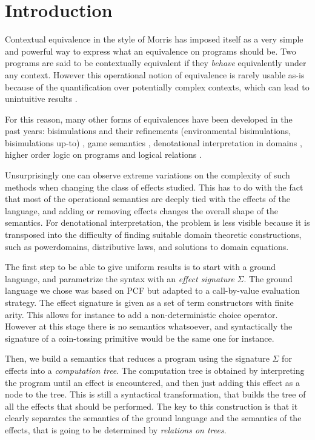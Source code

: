 \section{Introduction}

Contextual equivalence in the style of Morris
has imposed itself as a very simple and powerful
way to express what an equivalence on programs should be. 
Two programs are said to be contextually equivalent if 
they \emph{behave} equivalently under any context. 
However this operational notion of equivalence is rarely usable 
as-is because of the quantification over potentially complex 
contexts, which can lead to unintuitive results \cite{pitts1997operationally}.

For this reason, many other forms of equivalences have 
been developed in the past years: bisimulations 
and their refinements (environmental bisimulations, 
bisimulations up-to) \cite{koutavas2011applicative}, 
game semantics \cite{abramsky1999game}, 
denotational interpretation in domains \cite{scott1982domains}, 
higher order logic on 
programs \cite{honda2005observationally} 
and logical relations \cite{Pitts2000}.

Unsurprisingly one can observe extreme variations on 
the complexity of such methods when changing  
the class of effects studied. This has to do with 
the fact that most of the operational semantics 
are deeply tied with the effects of the language, 
and adding or removing effects changes the overall 
shape of the semantics. For denotational interpretation,
the problem is less visible because it is transposed 
into the difficulty of finding suitable domain theoretic constructions, 
such as powerdomains, distributive laws,
and solutions to domain equations.


The first step to be able to give uniform results 
is to start with a ground language, and parametrize 
the syntax with an \emph{effect signature} $\Sigma$. The ground
language we chose was based on PCF \cite{plotkin1977lcf} 
but adapted to a call-by-value evaluation strategy.
The effect signature is given as a set of term constructors 
with finite arity. This allows for instance to add 
a non-deterministic choice operator. However at this 
stage there is no semantics whatsoever, and syntactically 
the signature of a coin-tossing primitive would be the same one 
for instance.

Then, we build a semantics that reduces a program 
using the signature $\Sigma$ for effects into 
a \emph{computation tree}. The computation tree 
is obtained by interpreting the program until 
an effect is encountered, and then just adding 
this effect as a node to the tree. This is still 
a syntactical transformation, that builds the 
tree of all the effects that should be performed. 
The key to this construction is that it clearly 
separates the semantics of the ground language 
and the semantics of the effects, that is going 
to be determined by \emph{relations on trees}.

